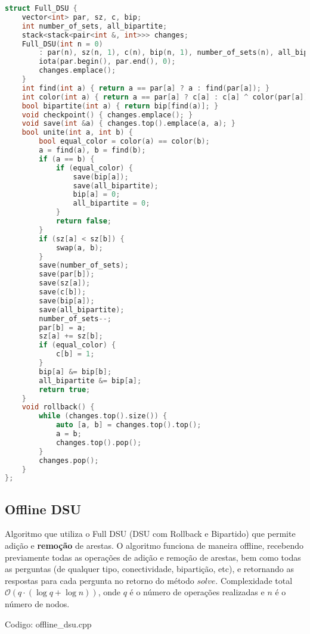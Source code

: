 \documentclass[10pt, a4paper, oneside]{book}
\begin{document}
\begin{lstlisting}[language=C++]
struct Full_DSU {
    vector<int> par, sz, c, bip;
    int number_of_sets, all_bipartite;
    stack<stack<pair<int &, int>>> changes;
    Full_DSU(int n = 0)
        : par(n), sz(n, 1), c(n), bip(n, 1), number_of_sets(n), all_bipartite(1) {
        iota(par.begin(), par.end(), 0);
        changes.emplace();
    }
    int find(int a) { return a == par[a] ? a : find(par[a]); }
    int color(int a) { return a == par[a] ? c[a] : c[a] ^ color(par[a]); }
    bool bipartite(int a) { return bip[find(a)]; }
    void checkpoint() { changes.emplace(); }
    void save(int &a) { changes.top().emplace(a, a); }
    bool unite(int a, int b) {
        bool equal_color = color(a) == color(b);
        a = find(a), b = find(b);
        if (a == b) {
            if (equal_color) {
                save(bip[a]);
                save(all_bipartite);
                bip[a] = 0;
                all_bipartite = 0;
            }
            return false;
        }
        if (sz[a] < sz[b]) {
            swap(a, b);
        }
        save(number_of_sets);
        save(par[b]);
        save(sz[a]);
        save(c[b]);
        save(bip[a]);
        save(all_bipartite);
        number_of_sets--;
        par[b] = a;
        sz[a] += sz[b];
        if (equal_color) {
            c[b] = 1;
        }
        bip[a] &= bip[b];
        all_bipartite &= bip[a];
        return true;
    }
    void rollback() {
        while (changes.top().size()) {
            auto [a, b] = changes.top().top();
            a = b;
            changes.top().pop();
        }
        changes.pop();
    }
};\end{lstlisting}
\hfill

\subsection{Offline DSU}


Algoritmo que utiliza o Full DSU (DSU com Rollback e Bipartido) que permite adição e \textbf{remoção} de arestas. O algoritmo funciona de maneira offline, recebendo previamente todas as operações de adição e remoção de arestas, bem como todas as perguntas (de qualquer tipo, conectividade, bipartição, etc), e retornando as respostas para cada pergunta no retorno do método $solve$. Complexidade total $\mathcal{O}(q\cdot(\log q + \log n))$, onde $q$ é o número de operações realizadas e $n$ é o número de nodos.

\hfill

Codigo: offline\_dsu.cpp
\end{document}
